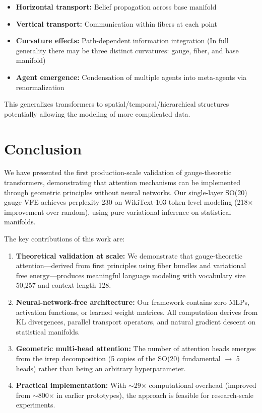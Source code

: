 \documentclass[twoside,11pt]{article}
\begin{document}
\begin{itemize}
\item \textbf{Horizontal transport:} Belief propagation across base manifold
\item \textbf{Vertical transport:} Communication within fibers at each point
\item \textbf{Curvature effects:} Path-dependent information integration (In full generality there may be three distinct curvatures: gauge, fiber, and base manifold)
\item \textbf{Agent emergence:} Condensation of multiple agents into meta-agents via renormalization
\end{itemize}

This generalizes transformers to spatial/temporal/hierarchical structures potentially allowing the modeling of more complicated data.

\section{Conclusion}

We have presented the first production-scale validation of gauge-theoretic transformers, demonstrating that attention mechanisms can be implemented through geometric principles without neural networks. Our single-layer SO(20) gauge VFE achieves perplexity 230 on WikiText-103 token-level modeling (218$\times$ improvement over random), using pure variational inference on statistical manifolds.

The key contributions of this work are:

\begin{enumerate}
  \item \textbf{Theoretical validation at scale:} We demonstrate that gauge-theoretic attention---derived from first principles using fiber bundles and variational free energy---produces meaningful language modeling with vocabulary size 50,257 and context length 128.

  \item \textbf{Neural-network-free architecture:} Our framework contains zero MLPs, activation functions, or learned weight matrices. All computation derives from KL divergences, parallel transport operators, and natural gradient descent on statistical manifolds.

  \item \textbf{Geometric multi-head attention:} The number of attention heads emerges from the irrep decomposition (5 copies of the SO(20) fundamental $\rightarrow$ 5 heads) rather than being an arbitrary hyperparameter.

  \item \textbf{Practical implementation:} With $\sim$29$\times$ computational overhead (improved from $\sim$800$\times$ in earlier prototypes), the approach is feasible for research-scale experiments.
\end{enumerate}
\end{document}
